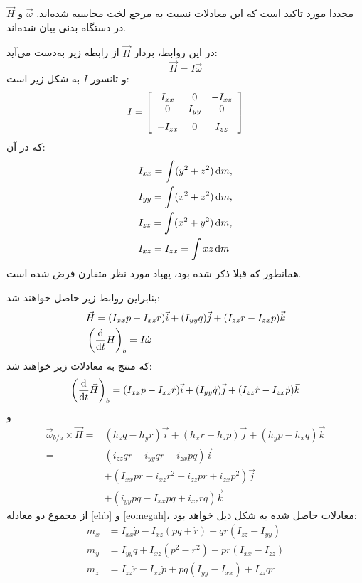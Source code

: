 مجددا مورد تاکید است که این معادلات نسبت به مرجع لخت محاسبه شده‌اند.
 $ \vec{\omega} $ و  $ \vec{H} $  در دستگاه بدنی بیان شده‌اند.

در این روابط، بردار $ \vec{H} $ از رابطه زیر به‌دست می‌آید:
\begin{equation}
\vec{H}=I{\vec{\omega}}
\end{equation}
و تانسور $ I $ به شکل زیر است:
\begin{equation} 
I= \left[ \begin {array}{ccc} I_{xx}&0&-I_{xz}\\
 0&I_{yy}&0\\ \noalign{\medskip}-I_{zx}&0&I_{zz}
\end {array} \right] 
\end{equation}
که در آن:
\begin{equation}
\begin{split}
&I_{xx}=\int(y^{2}+z^{2}) \,{\rm d}m, \\
&I_{yy}=\int(x^{2}+z^{2}) \,{\rm d}m, \\
&I_{zz}=\int(x^{2}+y^{2}) \,{\rm d}m, \\
&I_{xz}=I_{zx}=\int xz\,{\rm d}m
\end{split}
\end{equation}
همانطور که قبلا ذکر شده بود، پهپاد مورد نظر متقارن فرض شده است.

بنابراین روابط زیر حاصل خواهند شد:
\begin{align}
& \vec{H}=(I_{xx} p-I_{xz} r)\vec{i}+(I_{yy} q)\vec{j}+
(I_{zz} r-I_{zx} p)\vec{k} \\
&  \left( {\frac 
{\rm d}{{\rm d}t}}{H}   \right) _{{b}}=I {\dot {\omega}}
\end{align}
که منتج به معادلات زیر خواهند شد:
\begin{equation}\label{ehb}
 \left( {\frac 
{\rm d}{{\rm d}t}}\vec{H}   \right) _{{b}}=(I_{xx}\dot p-I_{xz}\dot r)\vec{i}+(I_{yy}\dot q)\vec{j}+
(I_{zz}\dot r-I_{zx}\dot p)\vec{k}
\end{equation}
و
\begin{equation}\label{eomegah}
\begin{split}
\vec{\omega}_{{b}/{a}} \times \vec{H}=&(h_zq-h_yr)\vec{i}+(h_xr-h_zp)\vec{j}+(h_yp-h_xq)\vec{k}\\
=&(i_{zz}qr-i_{yy}qr-i_{zx}pq)\vec{i}\\
&+(I_{xx}pr-i_{xz}r^2-i_{zz}pr+i_{zx}p^2)\vec{j}\\
& +(i_{yy}pq-I_{xx}pq+i_{xz}rq)\vec{k}
\end{split}
\end{equation}
از مجموع دو معادله 
\eqref{ehb}
و
\eqref{eomegah}،
 معادلات حاصل شده به شکل ذیل خواهد بود:
\begin{equation}\label{eq:momentequation}
\begin{split}
m_{x}&=I_{xx}\dot{p}-I_{xz} \left(pq+\dot r \right) +qr \left( 
I_{zz}-I_{yy} \right) \\
m_{y}&=I_{yy}\dot q+I_{xz} \left( {p}^{2}-{r}^{2} \right) 
+pr \left( I_{xx}-I_{zz} \right) \\
m_{z}&=I_{zz}\dot r-I_{xz}\dot p+pq \left(I_{yy}-I_{xx} \right) +I_{zz}qr
\end{split}
\end{equation}
